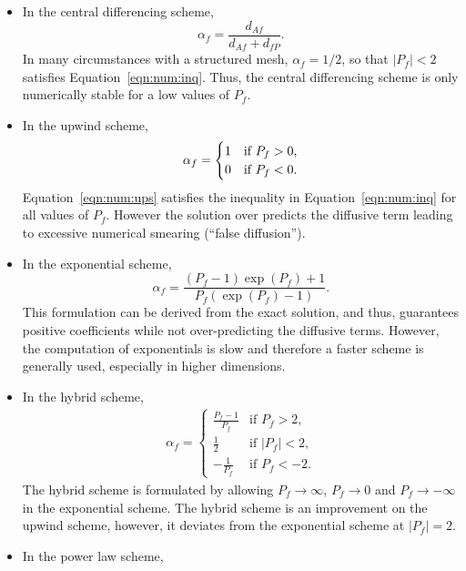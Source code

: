 \begin{itemize}
%
%
%
\item In the central differencing scheme,
\begin{equation}
\alpha_f = \frac{d_{Af}}{d_{Af}+d_{fP}}.
\label{eqn:num:cds}
\end{equation}
In many circumstances with a structured mesh, $\alpha_f=1/2$, so that
$|P_f|<2$ satisfies Equation~\eqref{eqn:num:inq}.  Thus, the central
differencing scheme is only numerically stable for a low values of
$P_f$.
%
%
%
\item In the upwind scheme,
\begin{eqnarray}
\alpha_f = \begin{cases}
1 & \text{if $P_f > 0$,} \\
0 & \text{if $ P_f < 0$.}
\end{cases}
\label{eqn:num:ups}
\end{eqnarray}
Equation~\eqref{eqn:num:ups} satisfies the inequality in
Equation~\eqref{eqn:num:inq} for all values of $P_f$.  However the
solution over predicts the diffusive term leading to excessive
numerical smearing (``false diffusion'').
%
%
%
\item In the exponential scheme,
\begin{equation}
\alpha_f = \frac{(P_f-1)\exp{(P_f)}+1}{P_f(\exp{(P_f)}-1)}.
\label{eqn:num:exs}
\end{equation}
This formulation can be derived from the exact solution, and thus,
guarantees positive coefficients while not over-predicting the
diffusive terms. However, the computation of exponentials is slow and
therefore a faster scheme is generally used, especially in higher
dimensions.
%
%
%
\item In the hybrid scheme,
\begin{eqnarray}
\alpha_f = 
\begin{cases}
    \frac{P_f-1}{P_f} & \text{if $P_f > 2$,} \\
    \frac{1}{2} & \text{if $|P_f| < 2$,} \\
    -\frac{1}{P_f} & \text{if $P_f < -2$.}
\end{cases}
\label{eqn:num:hys}
\end{eqnarray}
The hybrid scheme is formulated by allowing $P_f \rightarrow \infty$,
$P_f \rightarrow 0$ and $P_f \rightarrow -\infty$ in the exponential
scheme.  The hybrid scheme is an improvement on the upwind scheme,
however, it deviates from the exponential scheme at $|P_f|=2$.
%
%
%
\item In the power law scheme,

\end{itemize}

